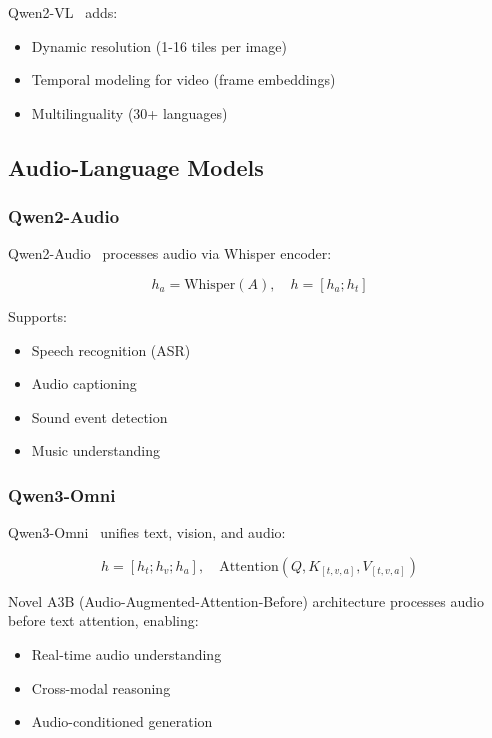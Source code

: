 \documentclass[11pt,letterpaper]{article}
\begin{document}
Qwen2-VL~\citep{wang2024qwen2vl} adds:
\begin{itemize}
\item Dynamic resolution (1-16 tiles per image)
\item Temporal modeling for video (frame embeddings)
\item Multilinguality (30+ languages)
\end{itemize}

\subsection{Audio-Language Models}

\subsubsection{Qwen2-Audio}

Qwen2-Audio~\citep{chu2024qwen2audio} processes audio via Whisper encoder:

\begin{equation}
h_a = \text{Whisper}(A), \quad h = [h_a; h_t]
\end{equation}

Supports:
\begin{itemize}
\item Speech recognition (ASR)
\item Audio captioning
\item Sound event detection
\item Music understanding
\end{itemize}

\subsubsection{Qwen3-Omni}

Qwen3-Omni~\citep{qwen2025qwen3} unifies text, vision, and audio:

\begin{equation}
h = [h_t; h_v; h_a], \quad \text{Attention}(Q, K_{[t,v,a]}, V_{[t,v,a]})
\end{equation}

Novel A3B (Audio-Augmented-Attention-Before) architecture processes audio before text attention, enabling:
\begin{itemize}
\item Real-time audio understanding
\item Cross-modal reasoning
\item Audio-conditioned generation
\end{itemize}
\end{document}
